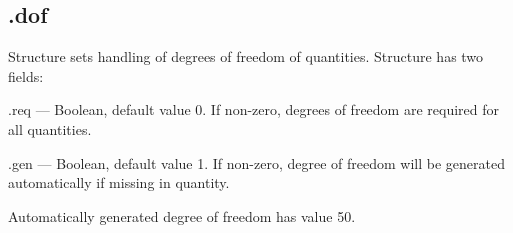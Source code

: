 \documentclass[12pt,a4paper,oneside]{report} %
\begin{document}
\subsection{\textsf{.dof}} %
\label{structcalcsetdof}
Structure sets handling of degrees of freedom of quantities. Structure has two fields:
\begin{tightdesc}
        \item [\textsf{.req}] ---  Boolean, default value 0. If non-zero, degrees of freedom are required for all quantities.
        \item [\textsf{.gen}] ---  Boolean, default value 1. If non-zero, degree of freedom will be generated
        automatically if missing in quantity.
\end{tightdesc}
Automatically generated degree of freedom has value 50.
\end{document}
